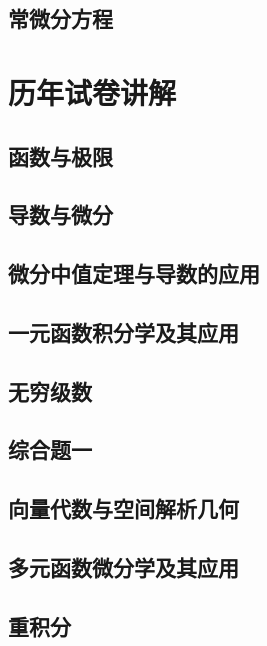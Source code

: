 \documentclass[openany,customfont=true]{HTNotes}
\begin{document}
  \chapter{常微分方程}
    

\part{历年试卷讲解}
  \chapter{函数与极限}\label{cha:1}
    

  \chapter{导数与微分}\label{cha:2}
    

  \chapter{微分中值定理与导数的应用}\label{cha:3}
    

  \chapter{一元函数积分学及其应用}\label{cha:4}
    

  \chapter{无穷级数}\label{cha:5}
    

  \chapter*{综合题一}
    

  \chapter{向量代数与空间解析几何}\label{cha:6}
    

  \chapter{多元函数微分学及其应用}\label{cha:7}
    

  \chapter{重积分}\label{cha:8}
    
\end{document}
